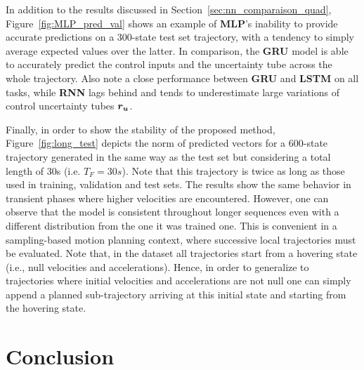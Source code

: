 In addition to the results discussed in Section~\ref{sec:nn_comparaison_quad}, Figure~\ref{fig:MLP_pred_val} shows an example of \textbf{MLP}'s inability to provide accurate predictions on a 300-state test set trajectory, with a tendency to simply average expected values over the latter.
In comparison, the \textbf{GRU} model is able to accurately predict the control inputs and the uncertainty tube across the whole trajectory. 
Also note a close performance between \textbf{GRU} and \textbf{LSTM} on all tasks, while \textbf{RNN} lags behind and tends to underestimate large variations of control uncertainty tubes $\boldsymbol{r_u}$.

Finally, in order to show the stability of the proposed method, Figure~\ref{fig:long_test} depicts the norm of predicted vectors for a 600-state trajectory generated in the same way as the test set but considering a total length of 30s (i.e. $T_F=30s$).
Note that this trajectory is twice as long as those used in training, validation and test sets.
The results show the same behavior in transient phases where higher velocities are encountered.
However, one can observe that the model is consistent throughout longer sequences even with a different distribution from the one it was trained one. 
This is convenient in a sampling-based motion planning context, where successive local trajectories must be evaluated.
Note that, in the dataset all trajectories start from a hovering state (i.e., null velocities and accelerations). 
Hence, in order to generalize to trajectories where initial velocities and accelerations are not null one can simply append a planned sub-trajectory arriving at this initial state and starting from the hovering state.

\section{Conclusion} \label{sec:NN_concl}
